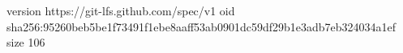 version https://git-lfs.github.com/spec/v1
oid sha256:95260beb5be1f73491f1ebe8aaff53ab0901dc59df29b1e3adb7eb324034a1ef
size 106
